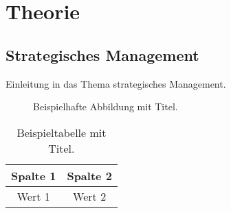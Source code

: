 \chapter{Theorie}
\section{Strategisches Management}
Einleitung in das Thema strategisches Management.

\begin{figure}[h!]
    \centering
   
    \caption{Beispielhafte Abbildung mit Titel.}
    \label{fig:beispiel}
\end{figure}

\begin{table}[h!]
    \centering
    \caption{Beispieltabelle mit Titel.}
    \label{tab:beispieltabelle}
    \begin{tabular}{|c|c|}
        \hline
        Spalte 1 & Spalte 2 \\
        \hline
        Wert 1 & Wert 2 \\
        \hline
    \end{tabular}
\end{table}